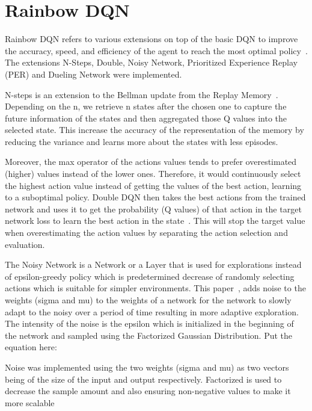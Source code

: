 \documentclass{article}
\begin{document}
\section{Rainbow DQN}
Rainbow DQN refers to various extensions on top of the basic DQN to improve the accuracy, speed,  and efficiency of the agent to reach the most optimal policy~\cite{hessel_rainbow_2017}.
The extensions N-Steps, Double, Noisy Network, Prioritized Experience Replay (PER) and Dueling Network were implemented.

N-steps is an extension to the Bellman update from the Replay Memory~\cite{garcia_understanding_2019}.
Depending on the n, we retrieve n states after the chosen one to capture the future information of the states and then aggregated those Q values into the selected state.
This increase the accuracy of the representation of the memory by reducing the variance and learns more about the states with less episodes.

Moreover, the max operator of the actions values tends to prefer overestimated (higher) values instead of the lower ones.
Therefore, it would continuously select the highest action value instead of getting the values of the best action, learning to a suboptimal policy.
Double DQN then takes the best actions from the trained network and uses it to get the probability (Q values) of that action in the target network loss to learn the best action in the state~\cite{hasselt_deep_2015}.
This will stop the target value when overestimating the action values by separating the action selection and evaluation.

The Noisy Network is a Network or a Layer that is used for explorations instead of epsilon-greedy policy which is predetermined decrease of randomly selecting actions which is suitable for simpler environments.
This paper~\cite{fortunato_noisy_2019}, adds noise to the weights (sigma and mu) to the weights of a network for the network to slowly adapt to the noisy over a period of time resulting in more adaptive exploration.
The intensity of the noise is the epsilon which is initialized in the beginning of the network and sampled using the Factorized Gaussian Distribution.
Put the equation here:

Noise was implemented using the two weights (sigma and mu) as two vectors being of the size of the input and output respectively.
Factorized is used to decrease the sample amount and also ensuring non-negative values to make it more scalable
\end{document}
